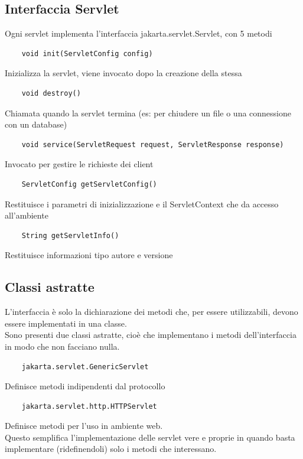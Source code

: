 \subsection{Interfaccia Servlet}
Ogni servlet implementa l'interfaccia jakarta.servlet.Servlet, con 5 metodi
\begin{verbatim}
    void init(ServletConfig config)
\end{verbatim}
Inizializza la servlet, viene invocato dopo la creazione della stessa
\begin{verbatim}
    void destroy()
\end{verbatim}
Chiamata quando la servlet termina (es: per chiudere un file o una connessione con un database)
\begin{verbatim}
    void service(ServletRequest request, ServletResponse response)
\end{verbatim}
Invocato per gestire le richieste dei client
\begin{verbatim}
    ServletConfig getServletConfig()
\end{verbatim}
Restituisce i parametri di inizializzazione e il ServletContext che da accesso all'ambiente
\begin{verbatim}
    String getServletInfo()
\end{verbatim}
Restituisce informazioni tipo autore e versione

\subsection{Classi astratte}
L'interfaccia è solo la dichiarazione dei metodi che, per essere utilizzabili, devono essere implementati in una classe.
\\Sono presenti due classi astratte, cioè che implementano i metodi dell'interfaccia in modo che non facciano nulla.
\begin{verbatim}
    jakarta.servlet.GenericServlet
\end{verbatim}
Definisce metodi indipendenti dal protocollo
\begin{verbatim}
    jakarta.servlet.http.HTTPServlet
\end{verbatim}
Definisce metodi per l'uso in ambiente web.
\\Questo semplifica l'implementazione delle servlet vere e proprie in quando basta implementare (ridefinendoli) solo i metodi che interessano.

